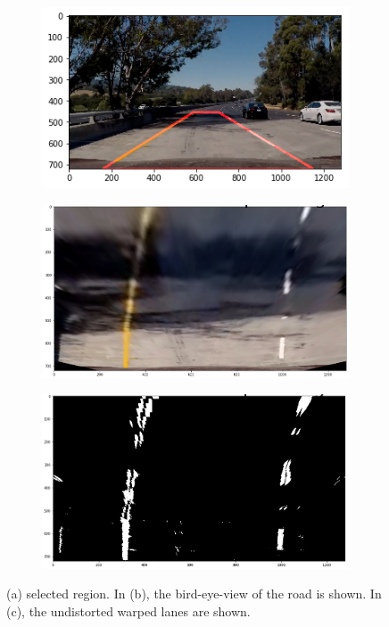 \documentclass[draftcls,onecolumn,12pt]{IEEEtran}
\theoremstyle{plain}
\theoremstyle{plain}
\begin{document}
\begin{figure}[htb!!]
    \centering
   \begin{subfigure}[t]{0.3\textwidth}
        \includegraphics[width=\textwidth]{./figures/SelectedRegion.png}\\
        \caption{}
    \end{subfigure}
    \hspace{-0.5cm}
    \begin{subfigure}[t]{0.3\textwidth}
        \includegraphics[width=\textwidth]{./figures/Warped_color.png}\\
        \caption{}
    \end{subfigure}
        \begin{subfigure}[t]{0.3\textwidth}
        \includegraphics[width=\textwidth]{./figures/Warped.png}\\
        \caption{}
    \end{subfigure}
    \caption{(a) selected region. In (b), the bird-eye-view of the road is shown. In (c), the undistorted warped lanes are shown.}\label{Fig:Warp}
\end{figure}
\end{document}
